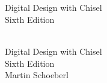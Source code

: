 \documentclass[%
    10pt,
    headinclude, footexclude,
    openright, %
    notitlepage,
    cleardoubleempty,
    headsepline,
    pointlessnumbers,
    bibtotoc, idxtotoc,
    ]{scrbook}
\newif\ifbook
\begin{document}
\ifbook
\else

\newpage
\thispagestyle{empty}
~
\newpage
\fi



\begin{flushleft}
\pagestyle{empty}
\ \\
\vspace{1cm}
{\mdseries\huge Digital Design with Chisel}
\ \\
\vspace{1cm}
{\mdseries\Large Sixth Edition}
\cleardoublepage
\end{flushleft}
\newpage


\begin{flushleft}
\pagestyle{empty}
\ \\
\vspace{1cm}
{\Huge Digital Design with Chisel\\
\bigskip
{\huge Sixth Edition}\\
\bigskip
\bigskip
\bigskip
\bigskip
\bigskip
{\huge Martin Schoeberl}
\medskip\\

}

\newpage
\end{flushleft}
\end{document}
